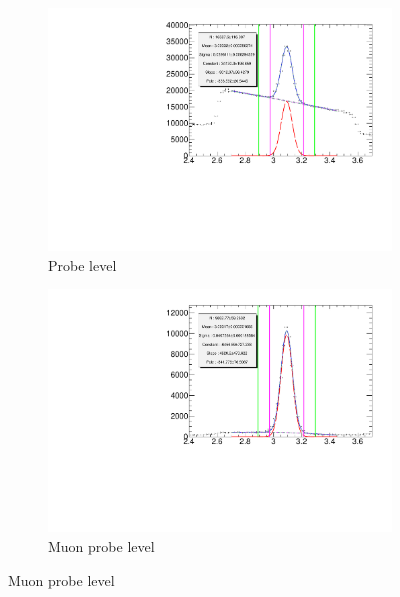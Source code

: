 \begin{figure}[thbp]
  \centering
    \begin{subfigure}[b]{0.54\textwidth}
    \includegraphics[width=\textwidth]{PartCalibration2012/Plots/Kinematics/Data_InvMass_pt_5_6_barrel_probe.pdf}
      \caption{Probe level}
    \end{subfigure}

    \begin{subfigure}[b]{0.54\textwidth}
      \includegraphics[width=\textwidth]{PartCalibration2012/Plots/Kinematics/Data_InvMass_pt_5_6_barrel_muonprobe.pdf}
      \caption{Muon probe level}   
    \end{subfigure}


\end{figure}
